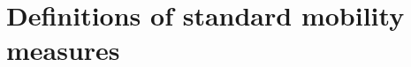 \documentclass[11pt]{article}
\newcommand{\Sref}[1]{Section~\ref{sec:#1}}
\numberwithin{equation}{section}
\begin{document}
%
%
%

%

\clearpage

\appendix

\section{Definitions of standard mobility measures}\label{sec:standard-mobility-measures}
\end{document}
